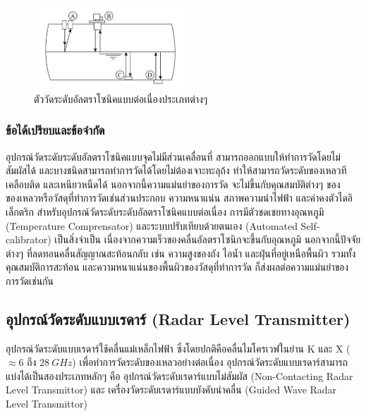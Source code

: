 \documentclass[final,11pt]{article}
\begin{document}
\begin{figure}[H]
    \centering
    \includegraphics[width=0.5\textwidth]{images/Screenshot_26.jpg}
    \caption{ตัววัดระดับอัลตราโซนิคแบบต่อเนื่องประเภทต่างๆ}
    \label{fig:ulc}
\end{figure}

\subsubsection{ข้อได้เปรียบและข้อจำกัด}
อุปกรณ์วัดระดับระดับอัลตราโซนิคแบบจุดไม่มีส่วนเคลื่อนที่ สามารถออกแบบให้ทำการวัดโดยไม่สัมผัสได้ และบางชนิดสามารถทำการวัดได้โดยไม่ต้องเจาะทะลุถ้ง 
ทำให้สามารถวัดระดับของเหลวทีเคลือบติด และเหนียวหนืดได้ นอกจากนี้ความแม่นยำของการวัด จะไม่ขึ้นกับคุณสมบัติต่างๆ 
ของของเหลวหรือวัสดุที่ทำการวัดเช่นส่วนประกอบ ความหนาแน่น สภาพความนำไฟฟ้า และค่าคงตัวไดอิเล็กตริก
สำหรับอุปกรณ์วัดระดับระดับอัลตราโซนิคแบบต่อเนื่อง การมีตัวชดเชยทางอุณหภูมิ (Temperature Comprensator) และระบบปรับเทียบด้วยตนเอง 
(Automated Self-calibrator) เป็นสิ่งจำเป็น เนื่องจากความเร็วของคลื่นอัลตราโซนิกจะขึ้นกับอุณหภูมิ นอกจากนี้ปัจจัยต่างๆ ที่ลดทอนคลื่นสัญญาณสะท้อนกลับ
เช่น ความสูงของถัง ไอน้ำ และฝุ่นที่อยู่เหนือพื้นผิว รวมทั้งคุณสมบัติการสะท้อน และความหนาแน่นของพื้นผิวของวัสดุที่ทำการวัด ก็ส่งผลต่อความแม่นยำของการวัดเช่นกัน

\subsection{อุปกรณ์วัดระดับแบบเรดาร์ (Radar Level Transmitter)}
อุปกรณ์วัดระดับแบบเรดาร์ใช้คลื่นแม่เหล็กไฟฟ้า ซึ่งโดยปกติคือคลื่นไมโครเวฟในย่าน K และ X ($\approx 6$ ถึง $\SI{28}{GHz}$) 
เพื่อทำการวัดระดับของเหลวอย่างต่อเนื่อง อุปกรณ์วัดระดับแบบเรดาร์สามารถแบ่งได้เป็นสองประเภทหลักๆ คือ อุปกรณ์วัดระดับเรดาร์แบบไม่สัมผัส
(Non-Contacting Radar Level Transmittor) และ เครื่องวัดระดับเรดาร์แบบบังคับนำคลื่น (Guided Wave Radar Level Transmittor) 
\end{document}
